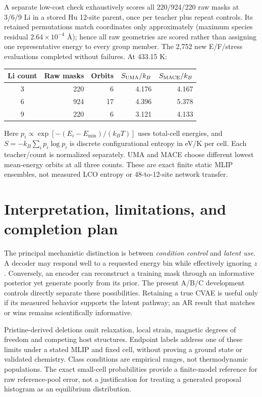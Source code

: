 \documentclass[10pt]{article}
\begin{document}
A separate low-cost check exhaustively scores all 220/924/220 raw masks at
3/6/9 Li in a stored Hu 12-site parent, once per teacher plus repeat controls.
Its retained permutations match coordinates only approximately (maximum species
residual $2.64\times 10^{-4}$ \AA); hence all raw geometries are scored rather
than assigning one representative energy to every group member. The 2,752 new
E/F/stress evaluations completed without failures. At 433.15 K:
\begin{center}\small
\begin{tabular}{crrrr}\toprule
Li count & Raw masks & Orbits & $S_{\rm UMA}/k_B$ & $S_{\rm MACE}/k_B$\\\midrule
3&220&6&4.176&4.167\\6&924&17&4.396&5.378\\9&220&6&3.121&4.133\\\bottomrule
\end{tabular}
\end{center}
Here $p_i\propto\exp[-(E_i-E_{\min})/(k_BT)]$ uses total-cell energies, and
$S=-k_B\sum_i p_i\log p_i$ is discrete configurational entropy in eV/K per cell.
Each teacher/count is normalized separately. UMA and MACE choose different
lowest mean-energy orbits at all three counts. These are exact finite static
MLIP ensembles, not measured LCO entropy or 48-to-12-site network transfer.
\newpage

\section{Interpretation, limitations, and completion plan}
The principal mechanistic distinction is between \emph{condition control} and
\emph{latent use}. A decoder may respond well to a requested energy bin while
effectively ignoring $z$. Conversely, an encoder can reconstruct a training
mask through an informative posterior yet generate poorly from its prior.
The present A/B/C development controls directly separate these possibilities. Retaining a
true CVAE is useful only if its measured behavior supports the latent pathway;
an AR result that matches or wins remains scientifically informative.

Pristine-derived deletions omit relaxation, local strain, magnetic degrees of
freedom and competing host structures. Endpoint labels address one of these
limits under a stated MLIP and fixed cell, without proving a ground state or
validated chemistry. Class conditions are empirical ranges, not thermodynamic
populations. The exact small-cell probabilities provide a finite-model reference
for raw reference-pool error, not a justification for treating a generated
proposal histogram as an equilibrium distribution.
\end{document}
